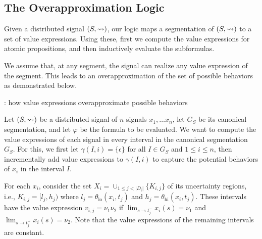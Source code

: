 \subsection{The Overapproximation Logic}
Given a distributed signal $(S,{\rightsquigarrow})$, our logic maps a segmentation of $(S,{\rightsquigarrow})$ to a set of value expressions.
Using these, first we compute the value expressions for atomic propositions, and then inductively evaluate the subformulas.

We assume that, at any segment, the signal can realize any value expression of the segment.
This leads to an overapproximation of the set of possible behaviors as demonstrated below.

\begin{example}
	\TODO: how value expressions overapproximate possible behaviors
\end{example}

Let $(S,{\rightsquigarrow})$ be a distributed signal of $n$ signals $x_1, \ldots x_n$, let $G_S$ be its canonical segmentation, and let $\varphi$ be the formula to be evaluated.
We want to compute the value expressions of each signal in every interval in the canonical segmentation $G_S$.
For this, we first let $\gamma(I, i) = \{\epsilon\}$ for all $I \in G_S$ and $1 \leq i \leq n$, then incrementally add value expressions to $\gamma(I, i)$ to capture the potential behaviors of $x_i$ in the interval $I$.

For each $x_i$, consider the set $X_i = \cup_{1 \leq j < |D_i|} \{K_{i,j}\}$ of its uncertainty regions, i.e.,  $K_{i,j} = [l_j, h_j)$ where $l_j = \theta_{\text{lo}}(x_i, t_j)$ and $h_j = \theta_{\text{hi}}(x_i, t_j)$.
These intervals have the value expression $v_{i,j} = \nu_1 \nu_2$ if $\lim_{s \to t_j^-} x_i(s) = \nu_1$ and $\lim_{s \to t_j^+} x_i(s) = \nu_2$.
Note that the value expressions of the remaining intervals are constant.

